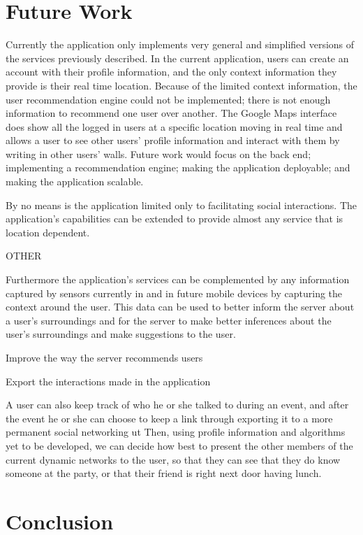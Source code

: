 \documentclass[11pt]{article}
\begin{document}
\section{Future Work}

Currently the application only implements very general and simplified versions of the services previously described. In the current application, users can create an account with their profile information, and the only context information they provide is their real time location. Because of the limited context information, the user recommendation engine could not be implemented; there is not enough information to recommend one user over another. The Google Maps interface does show all the logged in users at a specific location moving in real time and allows a user to see other users' profile information and interact with them by writing in other users' walls. Future work would focus on the back end; implementing a recommendation engine;  making the application deployable; and making the application scalable.


By no means is the application limited only to facilitating social interactions. The application's capabilities can be extended to provide almost any service that is location dependent. 


OTHER

Furthermore the application's services can be complemented by any information captured by sensors currently in and in future mobile devices by capturing the context around the user. This data can be used to better inform the server about a user's surroundings and for the server to make better inferences about the user's surroundings and make suggestions to the user.


Improve the way the server recommends users


Export the interactions made in the application


A user can also keep track of who he or she talked to during an event, and after the event he or she can choose to keep a link through exporting it to a more permanent social networking ut Then, using profile information and algorithms yet to be developed, we can decide how best to present the other members of the current dynamic networks to the user, so that they can see that they do know someone at the party, or that their friend is right next door having lunch.




 \section{Conclusion}
\end{document}
